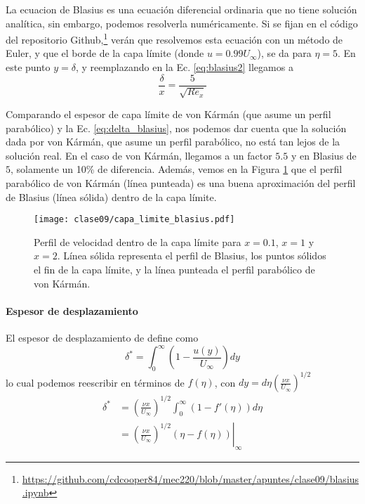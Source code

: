  La ecuacion de Blasius es una ecuación diferencial ordinaria que no tiene solución analítica, sin embargo, podemos resolverla numéricamente.
 Si se fijan en el código del repositorio Github,\footnote{\url{https://github.com/cdcooper84/mec220/blob/master/apuntes/clase09/blasius.ipynb}} verán  que resolvemos esta ecuación con un método de Euler, y que el borde de la capa límite (donde $u=0.99U_\infty$), se da para $\eta=5$.
En este punto $y=\delta$, y reemplazando en la Ec. \eqref{eq:blasius2} llegamos a
%
\begin{equation}\label{eq:delta_blasius}
\frac{\delta}{x} = \frac{5}{\sqrt{Re_x}}
\end{equation}

Comparando el espesor de capa límite de von Kármán (que asume un perfil parabólico) y la Ec. \eqref{eq:delta_blasius}, nos podemos dar cuenta que la solución dada por von Kármán, que asume un perfil parabólico, no está tan lejos de la solución real.
En el caso de von Kármán, llegamos a un factor $5.5$ y en Blasius de $5$, solamente un 10\% de diferencia.
Además, vemos en la Figura \ref{fig:capa_limite_blasius} que el perfil parabólico de von Kármán (línea punteada) es una buena aproximación del perfil de Blasius (línea sólida) dentro de la capa límite.
%
\begin{figure}
\centering
\texttt{[image: clase09/capa\_limite\_blasius.pdf]}
\caption{Perfil de velocidad dentro de la capa límite para $x=0.1$, $x=1$ y $x=2$. Línea sólida representa el perfil de Blasius, los puntos sólidos el fin de la capa límite, y la línea punteada el perfil parabólico de von Kármán.}
\label{fig:capa_limite_blasius}
\end{figure}

\paragraph*{Espesor de desplazamiento}

El espesor de desplazamiento de define como 
%
\begin{equation}
\delta^* = \int_0^\infty\left(1-\frac{u(y)}{U_\infty}\right)dy
\end{equation}
%
lo cual podemos reescribir en términos de $f(\eta)$, con $dy = d\eta\left(\frac{\nu x}{U_\infty}\right)^{1/2}$
%
\begin{align}
\delta^* &= \left(\frac{\nu x}{U_\infty}\right)^{1/2}\int_0^\infty(1-f'(\eta))d\eta\\
& = \left.\left(\frac{\nu x}{U_\infty}\right)^{1/2} (\eta-f(\eta))\right|_\infty
\end{align}

